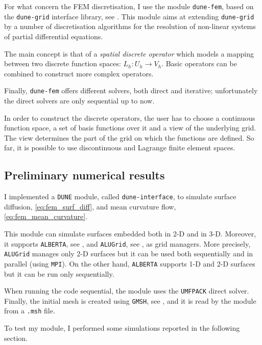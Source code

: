 \documentclass[a4paper,11pt, onecolumn]{article}
\newcommand{\cor}[1]{\textit{#1}} %
\begin{document}
For what concern the FEM discretisation, I use the module \verb|dune-fem|,
based on the \verb|dune-grid| interface library, see \cite{dunefempaper10}.
This module aims at extending \verb|dune-grid| by a number of discretisation
algorithms for the resolution of non-linear systems of partial differential
equations.

The main concept is that of a \cor{spatial discrete operator} which models a
mapping between two discrete function spaces: $L_h : U_h \to V_h$. Basic
operators can be combined to construct more complex operators.

Finally, \verb|dune-fem| offers different solvers, both direct and iterative;
unfortunately the direct solvers are only sequential up to now.
\newline

In order to construct the discrete operators, the user has to choose a
continuous function space, a set of basis functions over it and a view of the
underlying grid. The view determines the part of the grid on which the functions
are defined. So far, it is possible to use discontinuous and Lagrange finite
element spaces.

\subsection{Preliminary numerical results}

I implemented a \verb|DUNE| module, called \verb|dune-interface|, to simulate
surface diffusion, \eqref{eq:fem_surf_diff}, and  mean curvature flow,
\eqref{eq:fem_mean_curvature}.

This module can simulate surfaces embedded both in 2-D and in 3-D. Moreover, it
supports \verb|ALBERTA|, see \cite{Alberta}, and \verb|ALUGrid|, see
\cite{alugrid}, as grid managers. More precisely, \verb|ALUGrid| manages only
2-D surfaces but it can be used both sequentially and in parallel (using
\verb|MPI|). On the other hand, \verb|ALBERTA| supports 1-D and 2-D surfaces but
it can be run only sequentially.
\newline

When running the code sequential, the module uses the \verb|UMFPACK| direct
solver. Finally, the initial mesh is created using \verb|GMSH|, see
\cite{GeuzaineR09}, and it is read by the module from a \verb|.msh| file.
\newline

To test my module, I performed some simulations reported in the following
section.
\end{document}
